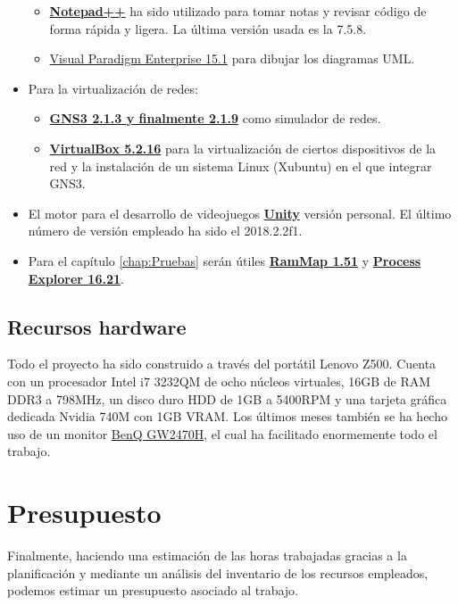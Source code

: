 \begin{itemize}
\begin{itemize}
\item \href{https://notepad-plus-plus.org/}{\textbf{Notepad++}} ha sido utilizado para tomar notas y revisar código de forma rápida y ligera. La última versión usada es la 7.5.8.
\item \href{https://www.visual-paradigm.com/}{Visual Paradigm Enterprise 15.1} para dibujar los diagramas UML.
\end{itemize}
\item Para la virtualización de redes:
\begin{itemize}
\item \href{https://www.gns3.com/}{\textbf{GNS3 2.1.3 y finalmente 2.1.9}} como simulador de redes.
\item \href{https://www.virtualbox.org/}{\textbf{VirtualBox 5.2.16}} para la virtualización de ciertos dispositivos de la red y la instalación de un sistema Linux (Xubuntu) en el que integrar GNS3.
\end{itemize}
\item El motor para el desarrollo de videojuegos \href{https://unity3d.com/es}{\textbf{Unity}} versión personal. El último número de versión empleado ha sido el 2018.2.2f1.
\item Para el capítulo \ref{chap:Pruebas} serán útiles \href{https://docs.microsoft.com/en-us/sysinternals/downloads/rammap}{\textbf{RamMap 1.51}} y \href{https://docs.microsoft.com/en-us/sysinternals/downloads/process-explorer}{\textbf{Process Explorer 16.21}}.
\end{itemize}

\subsection{Recursos hardware}
Todo el proyecto ha sido construido a través del portátil Lenovo Z500. Cuenta con un procesador Intel i7 3232QM de ocho núcleos virtuales, 16GB de RAM DDR3 a 798MHz, un disco duro HDD de 1GB a 5400RPM y una tarjeta gráfica dedicada Nvidia 740M con 1GB VRAM. Los últimos meses también se ha hecho uso de un monitor \href{https://www.benq.es/product/monitor/gw2470h/}{BenQ GW2470H}, el cual ha facilitado enormemente todo el trabajo.

\section{Presupuesto}
Finalmente, haciendo una estimación de las horas trabajadas gracias a la planificación y mediante un análisis del inventario de los recursos empleados, podemos estimar un presupuesto asociado al trabajo.

